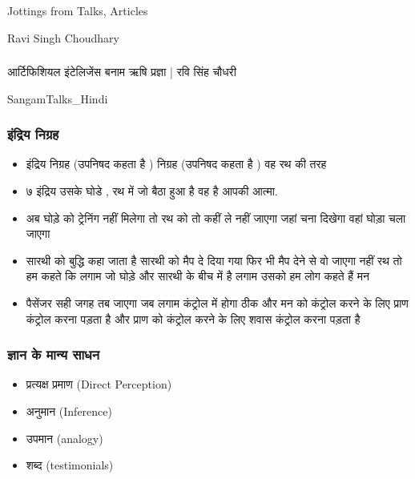 \begin{frame}[fragile]\frametitle{}
\begin{center}
{\Large Jottings from Talks, Articles}

{\small Ravi Singh Choudhary}


\end{center}
\end{frame}

\begin{frame}[fragile]\frametitle{}
\begin{center}
{\Large आर्टिफिशियल इंटेलिजेंस बनाम ऋषि प्रज्ञा | रवि सिंह चौधरी }

{\small SangamTalks\_Hindi}


\end{center}
\end{frame}

\begin{frame}[fragile]\frametitle{इंद्रिय निग्रह}
\begin{itemize}
	\item इंद्रिय निग्रह (उपनिषद कहता है ) निग्रह (उपनिषद कहता है ) वह रथ की तरह
	\item ७  इंद्रिय उसके घोडे ,  रथ में जो बैठा हुआ है वह है आपकी आत्मा.
	\item अब घोड़े को ट्रेनिंग नहीं मिलेगा तो रथ को तो कहीं ले नहीं जाएगा जहां चना दिखेगा वहां घोड़ा चला जाएगा 
	\item सारथी को बुद्धि कहा जाता है सारथी को मैप दे दिया गया फिर भी मैप देने से वो जाएगा नहीं रथ तो हम कहते कि लगाम जो घोड़े और सारथी के बीच में है लगाम उसको हम लोग कहते हैं मन
	\item पैसेंजर सही जगह तब जाएगा जब लगाम कंट्रोल में होगा ठीक और मन को कंट्रोल करने के लिए प्राण कंट्रोल करना पड़ता है और प्राण को कंट्रोल करने के लिए शवास कंट्रोल करना पड़ता है
\end{itemize}

\end{frame}

\begin{frame}[fragile]\frametitle{ज्ञान के मान्य साधन}
\begin{itemize}
	\item प्रत्यक्ष प्रमाण  (Direct Perception)
	\item अनुमान (Inference)
	\item उपमान (analogy)
	\item शब्द (testimonials)
\end{itemize}

\end{frame}

